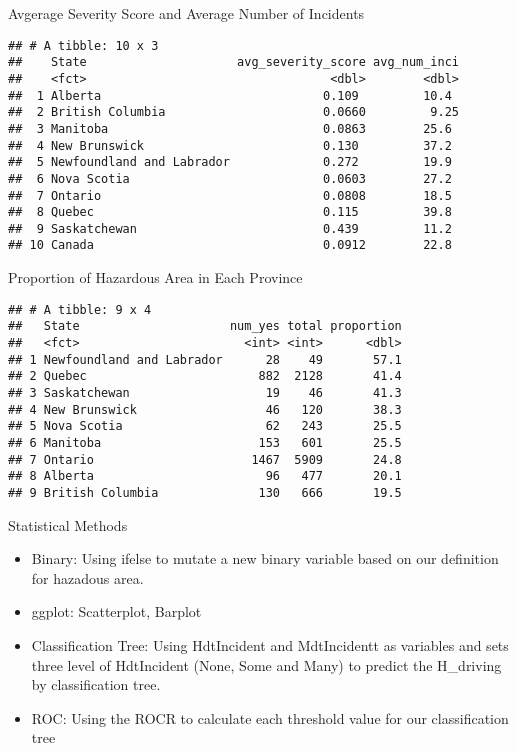 \documentclass[ignorenonframetext,]{beamer}
\providecommand{\tightlist}{%
  \setlength{\itemsep}{0pt}\setlength{\parskip}{0pt}}
\begin{document}
\begin{frame}[fragile]{Avgerage Severity Score and Average Number of
Incidents}

\begin{verbatim}
## # A tibble: 10 x 3
##    State                     avg_severity_score avg_num_inci
##    <fct>                                  <dbl>        <dbl>
##  1 Alberta                               0.109         10.4 
##  2 British Columbia                      0.0660         9.25
##  3 Manitoba                              0.0863        25.6 
##  4 New Brunswick                         0.130         37.2 
##  5 Newfoundland and Labrador             0.272         19.9 
##  6 Nova Scotia                           0.0603        27.2 
##  7 Ontario                               0.0808        18.5 
##  8 Quebec                                0.115         39.8 
##  9 Saskatchewan                          0.439         11.2 
## 10 Canada                                0.0912        22.8
\end{verbatim}

\end{frame}

\begin{frame}[fragile]{Proportion of Hazardous Area in Each Province}

\begin{verbatim}
## # A tibble: 9 x 4
##   State                     num_yes total proportion
##   <fct>                       <int> <int>      <dbl>
## 1 Newfoundland and Labrador      28    49       57.1
## 2 Quebec                        882  2128       41.4
## 3 Saskatchewan                   19    46       41.3
## 4 New Brunswick                  46   120       38.3
## 5 Nova Scotia                    62   243       25.5
## 6 Manitoba                      153   601       25.5
## 7 Ontario                      1467  5909       24.8
## 8 Alberta                        96   477       20.1
## 9 British Columbia              130   666       19.5
\end{verbatim}

\end{frame}

\begin{frame}{Statistical Methods}

\begin{itemize}
\tightlist
\item
  Binary: Using ifelse to mutate a new binary variable based on our
  definition for hazadous area.
\item
  ggplot: Scatterplot, Barplot
\item
  Classification Tree: Using HdtIncident and MdtIncidentt as variables
  and sets three level of HdtIncident (None, Some and Many) to predict
  the H\_driving by classification tree.
\item
  ROC: Using the ROCR to calculate each threshold value for our
  classification tree
\end{itemize}

\end{frame}
\end{document}
